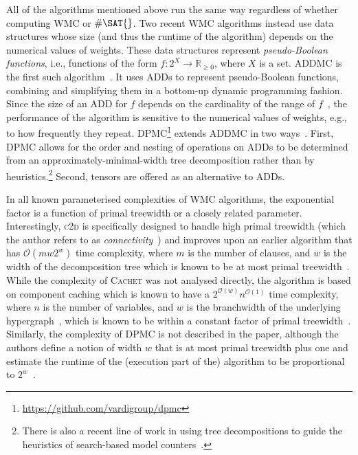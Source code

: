 \documentclass[runningheads]{llncs}
\begin{document}
All of the algorithms mentioned above run the same way regardless of whether
computing \textsf{WMC} or $\#\SAT{}$. Two recent \textsf{WMC} algorithms instead
use data structures whose size (and thus the runtime of the algorithm) depends
on the numerical values of weights. These data structures represent
\emph{pseudo-Boolean functions}, i.e., functions of the form
$f\colon 2^X \to \mathbb{R}_{\ge 0}$, where $X$ is a set. \textsc{ADDMC} is the
first such algorithm~\cite{DBLP:conf/aaai/DudekPV20}. It uses ADDs to represent
pseudo-Boolean functions, combining and simplifying them in a bottom-up dynamic
programming fashion. Since the size of an ADD for $f$ depends on the cardinality
of the range of $f$~\cite{DBLP:journals/fmsd/BaharFGHMPS97}, the performance of
the algorithm is sensitive to the numerical values of weights, e.g., to how
frequently they repeat.
\textsc{DPMC}\footnote{\url{https://github.com/vardigroup/dpmc}} extends
\textsc{ADDMC} in two ways~\cite{DBLP:conf/cp/DudekPV20}. First, \textsc{DPMC}
allows for the order and nesting of operations on ADDs to be determined from an
approximately-minimal-width tree decomposition rather than by
heuristics.\footnote{There is also a recent line of work in using tree
  decompositions to guide the heuristics of search-based model
  counters~\cite{DBLP:conf/cp/KorhonenJ21}.} Second, tensors are offered as an
alternative to ADDs.

In all known parameterised complexities of \textsf{WMC} algorithms, the
exponential factor is a function of primal treewidth or a closely related
parameter. Interestingly, \textsc{c2d} is specifically designed to handle high
primal treewidth (which the author refers to as
\emph{connectivity}~\cite{DBLP:conf/ijcai/Darwiche99}) and improves upon an
earlier algorithm that has $\mathcal{O}(mw2^w)$ time complexity, where $m$ is
the number of clauses, and $w$ is the width of the decomposition tree which is
known to be at most primal
treewidth~\cite{DBLP:journals/jacm/Darwiche01,DBLP:conf/ecai/Darwiche04}. While
the complexity of \textsc{Cachet} was not analysed directly, the algorithm is
based on component caching which is known to have a
$2^{\mathcal{O}(w)}n^{\mathcal{O}(1)}$ time complexity, where $n$ is the number
of variables, and $w$ is the branchwidth of the underlying
hypergraph~\cite{DBLP:journals/jair/BacchusDP09,DBLP:conf/sat/SangBBKP04}, which
is known to be within a constant factor of primal
treewidth~\cite{DBLP:journals/jct/RobertsonS91}. Similarly, the complexity of
\textsf{DPMC} is not described in the paper, although the authors define a
notion of width $w$ that is at most primal treewidth plus one and estimate the
runtime of the (execution part of the) algorithm to be proportional to
$2^w$~\cite{DBLP:conf/cp/DudekPV20}.
\end{document}
